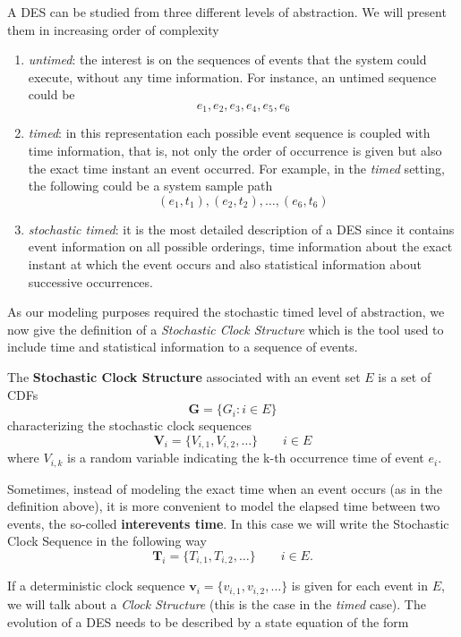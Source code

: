 A \gls{DES} can be studied from three different levels of abstraction. We will present them in increasing order of complexity
\begin{enumerate}
	\item \textit{untimed}: the interest is on the sequences of events that the system could execute, without any time information. For instance, an untimed sequence could be
	\[e_1, e_2, e_3, e_4, e_5, e_6 \]
	\item \textit{timed}: in this representation each possible event sequence is coupled with time information, that is, not only the order of occurrence is given but also the exact time instant an event occurred. For example, in the \textit{timed} setting, the following could be a system sample path
	\[(e_1,t_1), (e_2,t_2), \ldots, (e_6,t_6) \]
	
	
	\item \textit{stochastic timed}: it is the most detailed description of a \gls{DES} since it contains event information on all possible orderings, time information about the exact instant at which the event occurs and also statistical information about successive occurrences.
\end{enumerate}
As our modeling purposes required the stochastic timed level of abstraction, we now give the definition of a \textit{Stochastic Clock Structure} which is the tool used to include time and statistical information to a sequence of events.
\begin{definition}
	The \textbf{Stochastic Clock Structure} associated with an event set $E$ is a set of CDFs
	\[ \bm{G} = \{G_i \colon i \in E \}   \]
	characterizing the stochastic clock sequences
	\[ \bm{V}_{i} = \{V_{i,1},V_{i,2},\ldots \} \qquad i \in E \]
	where $V_{i,k}$ is a random variable indicating the k-th occurrence time of event $e_i$.
\end{definition}
\begin{remark}
	Sometimes, instead of modeling the exact time when an event occurs (as in the definition above), it is more convenient to model the elapsed time between two events, the so-colled \textbf{interevents time}. In this case we will write the Stochastic Clock Sequence in the following way \[ \bm{T}_{i} = \{T_{i,1},T_{i,2},\ldots \} \qquad i \in E. \]
\end{remark}
If a deterministic clock sequence  $\bm{v}_i = \{v_{i,1}, v_{i,2},\ldots\}$ is given for each event in $E$, we will talk about a \textit{Clock Structure} (this is the case in the \textit{timed} case). The evolution of a \gls{DES} needs to be described by a state equation of the form
